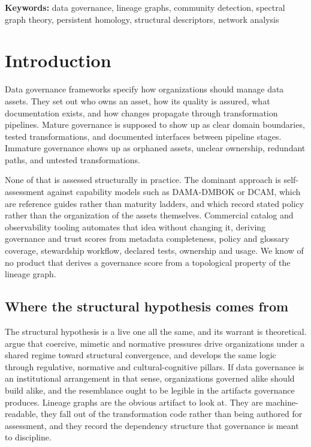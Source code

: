 \documentclass[11pt,a4paper]{article}
\begin{document}
\smallskip
\noindent\textbf{Keywords:} data governance, lineage graphs, community detection, spectral graph theory, persistent homology, structural descriptors, network analysis

\section{Introduction}

Data governance frameworks specify how organizations should manage data
assets. They set out who owns an asset, how its quality is assured, what
documentation exists, and how changes propagate through transformation
pipelines. Mature governance is supposed to show up as clear domain
boundaries, tested transformations, and documented interfaces between
pipeline stages. Immature governance shows up as orphaned assets,
unclear ownership, redundant paths, and untested transformations.

None of that is assessed structurally in practice. The dominant approach
is self-assessment against capability models such as DAMA-DMBOK
\citep{dama2017} or DCAM, which are reference guides rather than
maturity ladders, and which record stated policy rather than the
organization of the assets themselves. Commercial catalog and
observability tooling automates that idea without changing it, deriving
governance and trust scores from metadata completeness, policy and
glossary coverage, stewardship workflow, declared tests, ownership and
usage. We know of no product that derives a governance score from a
topological property of the lineage graph.

\subsection{Where the structural hypothesis comes from}

The structural hypothesis is a live one all the same, and its warrant is
theoretical. \citet{dimaggio1983} argue that coercive, mimetic and
normative pressures drive organizations under a shared regime toward
structural convergence, and \citet{scott2013} develops the same logic
through regulative, normative and cultural-cognitive pillars. If data
governance is an institutional arrangement in that sense, organizations
governed alike should build alike, and the resemblance ought to be
legible in the artifacts governance produces. Lineage graphs are the
obvious artifact to look at. They are machine-readable, they fall out of
the transformation code rather than being authored for assessment, and
they record the dependency structure that governance is meant to
discipline.
\end{document}
